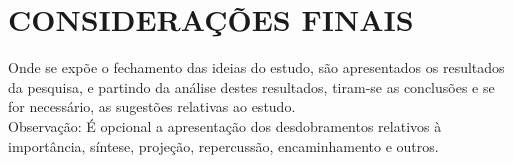 \chapter{CONSIDERAÇÕES FINAIS}
\label{chp:capitulo6}


Onde se expõe o fechamento das ideias do estudo, são apresentados os resultados da pesquisa, e partindo da análise destes resultados, tiram-se as conclusões e se for necessário, as sugestões relativas ao estudo. \\

Observação: É opcional a apresentação dos desdobramentos relativos à importância, síntese, projeção, repercussão, encaminhamento e outros.